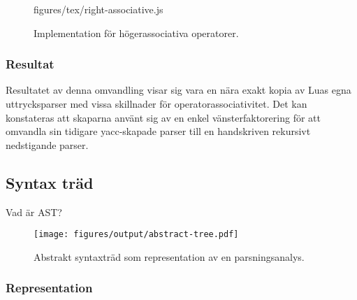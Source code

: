 \begin{figure}[ht]
    {figures/tex/right-associative.js}
  \caption{Implementation för högerassociativa operatorer.}
  \label{fig:rightassociative}
\end{figure}

\subsubsection{Resultat}

Resultatet av denna omvandling visar sig vara en nära exakt kopia av Luas egna
uttrycksparser med vissa skillnader för operatorassociativitet. Det kan
konstateras att skaparna använt sig av en enkel vänsterfaktorering för att
omvandla sin tidigare yacc-skapade parser till en handskriven rekursivt
nedstigande parser.

%
%
%

%
%

\subsection{Syntax träd}

Vad är AST?

\begin{figure}[ht]
  \texttt{[image: figures/output/abstract-tree.pdf]}
  \caption{Abstrakt syntaxträd som representation av en parsningsanalys.}
\end{figure}

\subsubsection{Representation}

